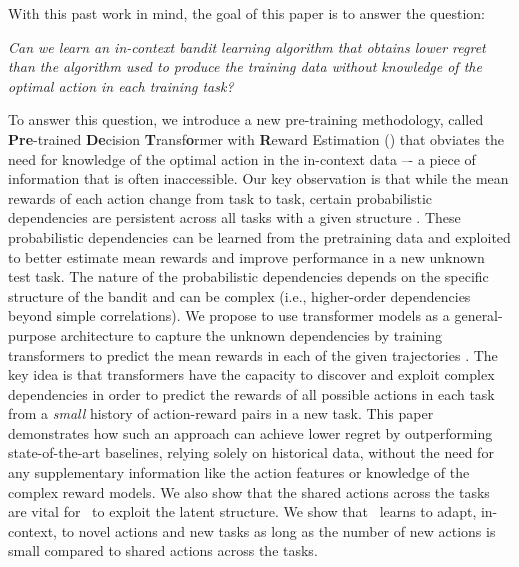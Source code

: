 \documentclass[10pt]{article}
\theoremstyle{plain}
\theoremstyle{definition}
\theoremstyle{remark}
\begin{document}
With this past work in mind, the goal of this paper is to answer the question:
\begin{tcolorbox}
\begin{center}
    \textit{Can we learn an in-context bandit learning algorithm that obtains lower regret than the algorithm used to produce the training data without knowledge of the optimal action in each training task?}
\end{center}
\end{tcolorbox}
To answer this question, we introduce a new pre-training methodology, called \textbf{Pre}-trained \textbf{De}cision \textbf{T}ransf\textbf{o}rmer with \textbf{R}eward Estimation (\pred) that obviates the need for knowledge of the optimal action in the in-context data –- a piece of information that is often inaccessible.
Our key observation is that while the mean rewards of each action change from task to task, certain probabilistic dependencies are persistent across all tasks with a given structure \citep{yang2020impact, yang2022nearly, mukherjee2023multi}. These probabilistic dependencies can be learned from the pretraining data and exploited to better estimate mean rewards and improve performance in a new unknown test task.
The nature of the probabilistic dependencies depends on the specific structure of the bandit and can be complex (i.e., higher-order dependencies beyond simple correlations).
We propose to use transformer models as a general-purpose architecture to capture the unknown dependencies by training transformers to predict the mean rewards in each of the given trajectories \citep{mirchandani2023large, zhao2023expel}.  The key idea is that transformers have the capacity to discover and exploit complex dependencies in order to predict the rewards of all possible actions in each task from a \emph{small} history of action-reward pairs in a new task.
This paper demonstrates how such an approach can achieve lower regret by outperforming state-of-the-art baselines, relying solely on historical data, without the need for any supplementary information like the action features or knowledge of the complex reward models.
We also show that the shared actions across the tasks are vital for \pred\ to exploit the latent structure.
We show that \pred\ learns to adapt, in-context, to novel actions and new tasks as long as the number of new actions is small compared to shared actions across the tasks.
\end{document}
